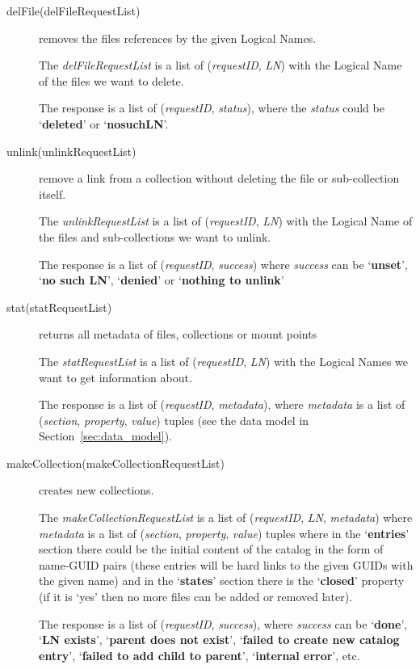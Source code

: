 \documentclass{book}
\begin{document}
\begin{description}
    \item[delFile(delFileRequestList)] removes the files references by the given Logical Names.

    The \emph{delFileRequestList} is a list of (\emph{requestID}, \emph{LN}) with the Logical Name of the files we want to delete. 
    
    The response is a list of (\emph{requestID}, \emph{status}), where the \emph{status} could be `\textbf{deleted}' or `\textbf{nosuchLN}'.
        
    \item[unlink(unlinkRequestList)] remove a link from a collection without deleting the file or sub-collection itself.
    
    The \emph{unlinkRequestList} is a list of (\emph{requestID}, \emph{LN}) with the Logical Name of the files and sub-collections we want to unlink.
    
    The response is a list of (\emph{requestID}, \emph{success}) where \emph{success} can be `\textbf{unset}', `\textbf{no such LN}', `\textbf{denied}' or `\textbf{nothing to unlink}'
    
    \item[stat(statRequestList)] returns all metadata of files, collections or mount points

    The \emph{statRequestList} is a list of (\emph{requestID}, \emph{LN}) with the Logical Names we want to get information about.
    
    The response is a list of (\emph{requestID}, \emph{metadata}), where \emph{metadata} is a list of (\emph{section}, \emph{property}, \emph{value}) tuples (see the data model in Section~\ref{sec:data_model}).
    
    \item[makeCollection(makeCollectionRequestList)] creates new collections.
    
    The \emph{makeCollectionRequestList} is a list of (\emph{requestID}, \emph{LN}, \emph{metadata}) where \emph{metadata} is a list of (\emph{section}, \emph{property}, \emph{value}) tuples where in the `\textbf{entries}' section there could be the initial content of the catalog in the form of name-GUID pairs (these entries will be hard links to the given GUIDs with the given name) and in the `\textbf{states}' section there is the `\textbf{closed}' property (if it is `yes' then no more files can be added or removed later).
    
    The response is a list of (\emph{requestID}, \emph{success}), where \emph{success} can be `\textbf{done}', `\textbf{LN exists}', `\textbf{parent does not exist}', `\textbf{failed to create new catalog entry}', `\textbf{failed to add child to parent}', `\textbf{internal error}', etc.
    

\end{description}
\end{document}
